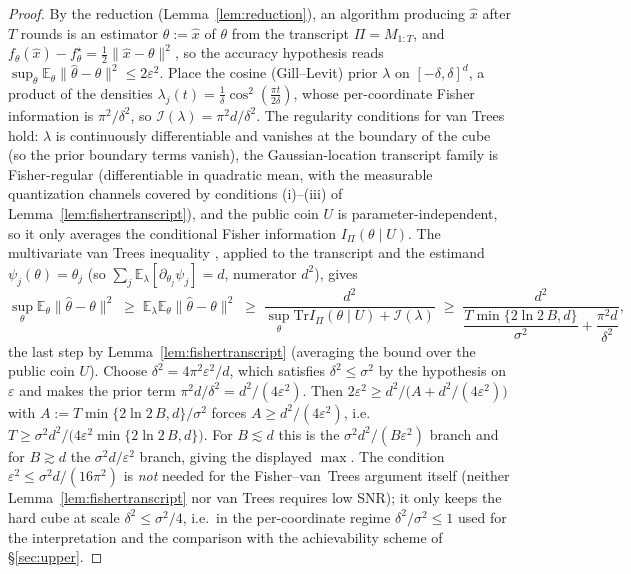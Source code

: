 \documentclass[11pt]{article}
\theoremstyle{definition}
\newcommand{\E}{\mathbb{E}}
\newcommand{\Tr}{\mathrm{Tr}}
\newcommand{\eps}{\varepsilon}
\begin{document}
\begin{proof}
By the reduction (Lemma~\ref{lem:reduction}), an algorithm producing $\hat x$ after $T$ rounds is an
estimator $\hat\theta:=\hat x$ of $\theta$ from the transcript $\Pi=M_{1:T}$, and
$f_\theta(\hat x)-f_\theta^\star=\tfrac12\|\hat x-\theta\|^2$, so the accuracy hypothesis reads
$\sup_\theta\E_\theta\|\hat\theta-\theta\|^2\le 2\eps^2$. Place the cosine (Gill--Levit) prior
$\lambda$ on $[-\delta,\delta]^d$, a product of the densities $\lambda_j(t)=\tfrac1\delta\cos^2(\tfrac{\pi t}{2\delta})$,
whose per-coordinate Fisher information is $\pi^2/\delta^2$, so $\mathcal I(\lambda)=\pi^2 d/\delta^2$.
The regularity conditions for van Trees hold: $\lambda$ is continuously differentiable and vanishes at the
boundary of the cube (so the prior boundary terms vanish), the Gaussian-location transcript family is
Fisher-regular (differentiable in quadratic mean, with the measurable quantization channels covered by
conditions (i)--(iii) of Lemma~\ref{lem:fishertranscript}), and the public coin $U$ is
parameter-independent, so it only averages the conditional Fisher information $I_\Pi(\theta\mid U)$. The
multivariate van Trees inequality
\citep[][as in Cor.~3 of \citealp{barnes2021fisher}]{gilllevit1995}, applied to the transcript and the
estimand $\psi_j(\theta)=\theta_j$ (so $\sum_j\E_\lambda[\partial_{\theta_j}\psi_j]=d$, numerator $d^2$),
gives
\[
  \sup_\theta\E_\theta\|\hat\theta-\theta\|^2
  \;\ge\;\E_\lambda\E_\theta\|\hat\theta-\theta\|^2
  \;\ge\;\frac{d^2}{\sup_\theta\Tr I_\Pi(\theta\mid U)+\mathcal I(\lambda)}
  \;\ge\;\frac{d^2}{\dfrac{T\min\{2\ln2\,B,d\}}{\sigma^2}+\dfrac{\pi^2 d}{\delta^2}},
\]
the last step by Lemma~\ref{lem:fishertranscript} (averaging the bound over the public coin $U$).
Choose $\delta^2=4\pi^2\eps^2/d$, which satisfies $\delta^2\le\sigma^2$ by the hypothesis on $\eps$ and
makes the prior term $\pi^2 d/\delta^2=d^2/(4\eps^2)$. Then $2\eps^2\ge d^2/\big(A+d^2/(4\eps^2)\big)$
with $A:=T\min\{2\ln2\,B,d\}/\sigma^2$ forces $A\ge d^2/(4\eps^2)$, i.e.\
$T\ge\sigma^2 d^2/\big(4\eps^2\min\{2\ln2\,B,d\}\big)$. For $B\lesssim d$ this is the
$\sigma^2 d^2/(B\eps^2)$ branch and for $B\gtrsim d$ the $\sigma^2 d/\eps^2$ branch, giving the displayed
$\max$. The condition $\eps^2\le\sigma^2 d/(16\pi^2)$ is \emph{not} needed for the Fisher--van~Trees
argument itself (neither Lemma~\ref{lem:fishertranscript} nor van Trees requires low SNR); it only keeps
the hard cube at scale $\delta^2\le\sigma^2/4$, i.e.\ in the per-coordinate regime $\delta^2/\sigma^2\le1$
used for the interpretation and the comparison with the achievability scheme of \S\ref{sec:upper}.
\end{proof}
\end{document}
